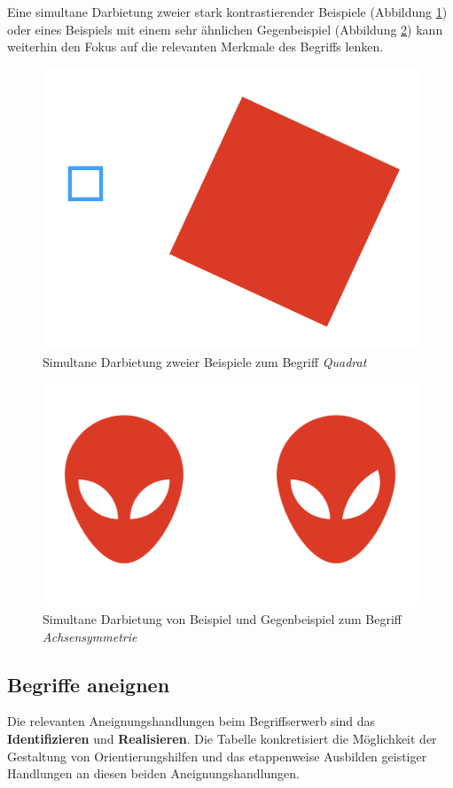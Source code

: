 \documentclass[
]{scrbook}
\theoremstyle{definition}
\theoremstyle{definition}
\theoremstyle{definition}
\theoremstyle{definition}
\theoremstyle{remark}
\begin{document}
Eine simultane Darbietung zweier stark kontrastierender Beispiele (Abbildung \ref{fig:SimultanBeispiel}) oder eines Beispiels mit einem sehr ähnlichen Gegenbeispiel (Abbildung \ref{fig:SimultanGegenbeispiel}) kann weiterhin den Fokus auf die relevanten Merkmale des Begriffs lenken.



\begin{figure}

{\centering \includegraphics[width=0.5\linewidth]{pictures/7-Quadrat} 

}

\caption{Simultane Darbietung zweier Beispiele zum Begriff \emph{Quadrat}}\label{fig:SimultanBeispiel}
\end{figure}



\begin{figure}

{\centering \includegraphics[width=0.4\linewidth]{pictures/7-Achsensymmetrie} 

}

\caption{Simultane Darbietung von Beispiel und Gegenbeispiel zum Begriff \emph{Achsensymmetrie}}\label{fig:SimultanGegenbeispiel}
\end{figure}

\subsection{Begriffe aneignen}\label{begriffe-aneignen}

Die relevanten Aneignungshandlungen beim Begriffserwerb sind das \textbf{Identifizieren} und \textbf{Realisieren}. Die Tabelle konkretisiert die Möglichkeit der Gestaltung von Orientierungshilfen und das etappenweise Ausbilden geistiger Handlungen an diesen beiden Aneignungshandlungen.
\end{document}

